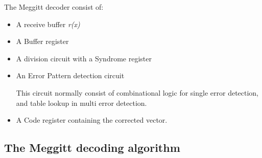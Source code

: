 \documentclass[MiniProjectMain]{subfiles}
\begin{document}
The Meggitt decoder consist of:
\begin{itemize}
\item
A receive buffer \textit{r(x)}

\item
A Buffer register

\item
A division circuit with a Syndrome register

\item
An Error Pattern detection circuit

\subitem This circuit normally consist of combinational logic for single error detection, and table lookup in multi error detection.

\item
A Code register containing the corrected vector.

\end{itemize}

\subsection{The Meggitt decoding algorithm}
\end{document}
